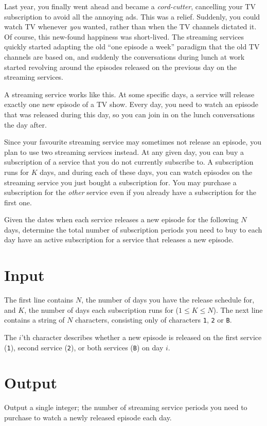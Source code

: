 
Last year, you finally went ahead and became a \emph{cord-cutter}, cancelling your TV subscription to avoid all the annoying ads.
This was a relief.
Suddenly, you could watch TV whenever \emph{you} wanted, rather than when the TV channels dictated it.
Of course, this new-found happiness was short-lived.
The streaming services quickly started adapting the old ``one episode a week'' paradigm that the old TV channels are based on, and suddenly the conversations during lunch at work started revolving around the episodes released on the previous day on the streaming services.

A streaming service works like this.
At some specific days, a service will release exactly one new episode of a TV show.
Every day, you need to watch an episode that was released during this day, so you can join in on the lunch conversations the day after.

Since your favourite streaming service may sometimes not release an episode, you plan to use two streaming services instead.
At any given day, you can buy a subscription of a service that you do not currently subscribe to.
A subscription runs for $K$ days, and during each of these days, you can watch episodes on the streaming service you just bought a subscription for.
You may purchase a subscription for the \emph{other} service even if you already have a subscription for the first one.

Given the dates when each service releases a new episode for the following $N$ days, determine the total number of subscription periods you need to buy to each day have an active subscription for a service that releases a new episode.

\section*{Input}
The first line contains $N$, the number of days you have the release schedule for, and $K$, the number of days each subscription runs for ($1 \le K \le N$).
The next line contains a string of $N$ characters, consisting only of characters \texttt{1}, \texttt{2} or \texttt{B}.

The $i$'th character describes whether a new episode is released on the first service (\texttt{1}), second service (\texttt{2}), or both services (\texttt{B}) on day $i$.

\section*{Output}
Output a single integer; the number of streaming service periods you need to purchase to watch a newly released episode each day.

